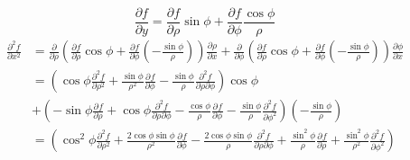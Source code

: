 \begin{equation}
    \frac{\partial{f}}{\partial{y}} = \frac{\partial{f}}{\partial{\rho}} \sin{\phi} + \frac{\partial{f}}{\partial{\phi}} \frac{\cos{\phi}}{\rho}
\end{equation}
\begin{equation}
    \begin{split}
        \frac{\partial^{2}{f}}{\partial{x}^{2}} &= \frac{\partial}{\partial{\rho}} \left( \frac{\partial{f}}{\partial{\rho}} \cos{\phi} + \frac{\partial{f}}{\partial{\phi}} \left( - \frac{\sin{\phi}}{\rho} \right) \right) \frac{\partial{\rho}}{\partial{x}} + \frac{\partial}{\partial{\phi}} \left( \frac{\partial{f}}{\partial{\rho}} \cos{\phi} + \frac{\partial{f}}{\partial{\phi}} \left( - \frac{\sin{\phi}}{\rho} \right) \right) \frac{\partial{\phi}}{\partial{x}} \\
        &= \left( \cos{\phi} \frac{\partial^{2}{f}}{\partial{\rho}^{2}} + \frac{\sin{\phi}}{\rho^{2}} \frac{\partial^{}{f}}{\partial{\phi}^{}} - \frac{\sin{\phi}}{\rho} \frac{\partial^{2}{f}}{\partial{\rho}\partial{\phi}} \right) \cos{\phi} \\
        &+ \left( - \sin{\phi} \frac{\partial^{}{f}}{\partial{\rho}^{}} + \cos{\phi} \frac{\partial^{2}{f}}{\partial{\rho}\partial{\phi}} - \frac{\cos{\phi}}{\rho} \frac{\partial^{}{f}}{\partial{\phi}^{}} - \frac{\sin{\phi}}{\rho} \frac{\partial^{2}{f}}{\partial{\phi}^{2}} \right) \left( - \frac{\sin{\phi}}{\rho} \right) \\
        &= \left( \cos^{2}{\phi} \frac{\partial^{2}{f}}{\partial{\rho}^{2}} + \frac{2 \cos{\phi} \sin{\phi}}{\rho^{2}} \frac{\partial^{}{f}}{\partial{\phi}^{}} - \frac{2 \cos{\phi} \sin{\phi}}{\rho} \frac{\partial^{2}{f}}{\partial{\rho}\partial{\phi}} + \frac{\sin^{2}{\phi}}{\rho} \frac{\partial^{}{f}}{\partial{\rho}^{}} + \frac{\sin^{2}{\phi}}{\rho^{2}} \frac{\partial^{2}{f}}{\partial{\phi}^{2}} \right)
    \end{split}
\end{equation}
